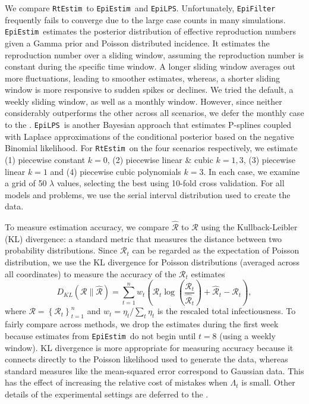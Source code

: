 \documentclass[10pt,letterpaper]{article}
\newcommand{\lr}[1]{\left(#1\right)}
\def\RtEstim{\texttt{RtEstim}}
\def\EpiEstim{\texttt{EpiEstim}}
\def\EpiLPS{\texttt{EpiLPS}}
\def\calR{\mathcal{R}}
\begin{document}
We compare \RtEstim\ to \EpiEstim\ and \EpiLPS. Unfortunately,
\texttt{EpiFilter} frequently fails to converge due to the large case counts in
many simulations. \EpiEstim\ estimates the posterior distribution of effective
reproduction numbers given a Gamma prior and Poisson distributed incidence. It
estimates the reproduction number over a sliding window, assuming the
reproduction number is constant during the specific time window. A longer
sliding window averages out more fluctuations, leading to smoother estimates,
whereas, a shorter sliding window is more responsive to sudden spikes or
declines. We tried the default, a weekly sliding window, as well as a monthly
window. However, since neither considerably outperforms the other across all
scenarios, we defer the monthly case to the . \EpiLPS\ is another
Bayesian approach that estimates P-splines coupled with Laplace approximations
of the conditional posterior based on the negative Binomial likelihood. For
\RtEstim\ on the four scenarios respectively, we estimate (1) piecewise constant
$k=0$, (2) piecewise linear \& cubic $k=1,3$, (3) piecewise linear $k=1$ and (4)
piecewise cubic polynomials $k=3$. In each case, we examine a grid of 50
$\lambda$ values, selecting the best using 10-fold cross validation. 
For all models and problems, we use the serial interval distribution used to 
create the data. 


To measure estimation accuracy, we compare $\widehat{\calR}$ to $\calR$ using
the Kullback-Leibler (KL) divergence: a standard metric that measures the
distance between two probability distributions. Since $\calR_t$ can be regarded
as the expectation of Poisson distribution, we use the KL divergence for
Poisson distributions (averaged across all coordinates) to measure the accuracy
of the $\calR_t$ estimates 
$$D_{KL}(\calR \parallel \widehat{\calR}) = \sum_{t=1}^n w_t \lr{\calR_t 
\log\left(\frac{\calR_t} {\widehat{\calR}_t}\right) + \widehat{\calR}_t - {\calR}_t},$$ 
where $\calR = \left\{ \calR_t \right\}_{t=1}^n$ and 
$w_t = \eta_t / \sum_t \eta_t$ is the rescaled total infectiousness.
To fairly compare across methods, we drop the estimates during the first
week because estimates from \EpiEstim\ do not begin until $t=8$ (using a weekly
window). KL divergence is more appropriate for measuring accuracy because it
connects directly to the Poisson likelihood used to generate the data, whereas
standard measures like the mean-squared error correspond to Gaussian data. This
has the effect of increasing the relative cost of mistakes when $\Lambda_t$ is 
small. Other details of the experimental settings are deferred to the . 
\end{document}
